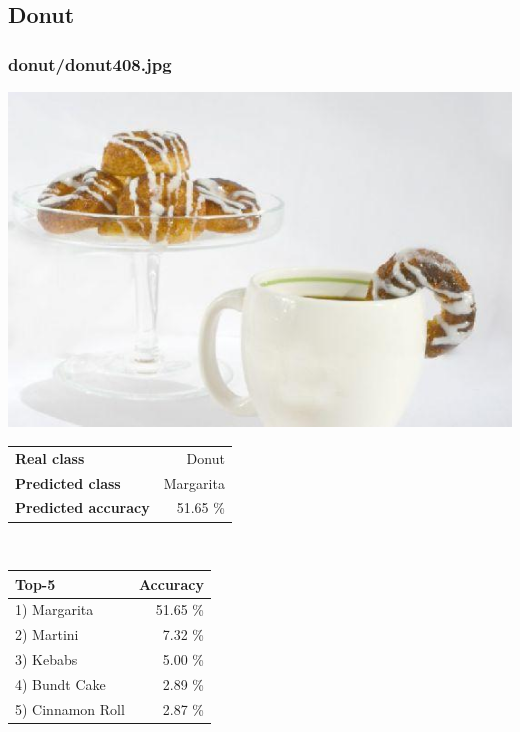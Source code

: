 \subsection{Donut}
    
\subsubsection{donut/donut408.jpg}

\begin{minipage}[t]{0.4\textwidth}
	\vspace{0pt}
	\includegraphics[width=\linewidth]{images/evaluation-images/donut/donut408.jpg}
\end{minipage}
\hfill
\begin{minipage}[t]{0.5\textwidth}
	\vspace{0pt}\raggedright
	\begin{tabularx}{\textwidth}{X r}
		\small \textbf{Real class} & \small Donut\\
		\small \textbf{Predicted class} & \small Margarita\\
		\small \textbf{Predicted accuracy} & \small 51.65 \%
    \end{tabularx}\\
    
    \vspace{6pt}
	\begin{tabularx}{\textwidth}{X r}
        \small \textbf{Top-5} & \small \textbf{Accuracy} \\
        \hline
		\small 1) Margarita & \small 51.65 \%\\\small 2) Martini & \small 7.32 \%\\\small 3) Kebabs & \small 5.00 \%\\\small 4) Bundt Cake & \small 2.89 \%\\\small 5) Cinnamon Roll & \small 2.87 \%
    \end{tabularx}
\end{minipage}
    
